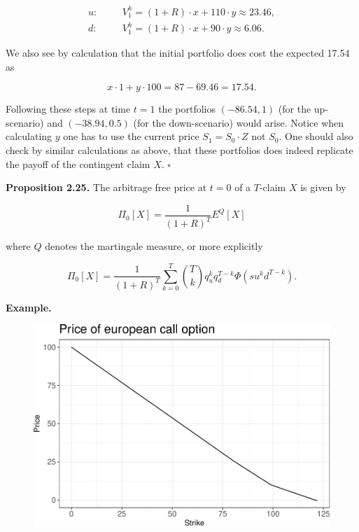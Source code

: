 \documentclass[
]{article}
\begin{document}
\begin{align*}
u:\hspace{20pt}&V_1^h=(1+R)\cdot x + 110\cdot y\approx 23.46,\\
d:\hspace{20pt}&V_1^h=(1+R)\cdot x + 90\cdot y\approx 6.06.
\end{align*}

We also see by calculation that the initial portfolio does cost the
expected 17.54 as

\[
x\cdot 1+y\cdot100=87-69.46=17.54.
\]

Following these steps at time \(t=1\) the portfolios \((-86.54,1)\) (for
the up-scenario) and \((-38.94,0.5)\) (for the down-scenario) would
arise. Notice when calculating \(y\) one has to use the current price
\(S_1=S_0\cdot Z\) not \(S_0\). One should also check by similar
calculations as above, that these portfolios does indeed replicate the
payoff of the contingent claim \(X\). \(\square\)

\textbf{Proposition 2.25.} The arbitrage free price at \(t=0\) of a
\(T\)-claim \(X\) is given by

\[
\Pi_0[X]=\frac{1}{(1+R)^T}E^Q[X]
\]

where \(Q\) denotes the martingale measure, or more explicitly

\[
\Pi_0[X]=\frac{1}{(1+R)^T}\sum_{k=0}^T\binom{T}{k}q_u^kq_d^{T-k}\Phi(su^kd^{T-k}).
\]

\textbf{Example.}

\begin{figure}\includegraphics{FinKont_homework_files/figure-latex/unnamed-chunk-6-1}\end{figure}
\end{document}
